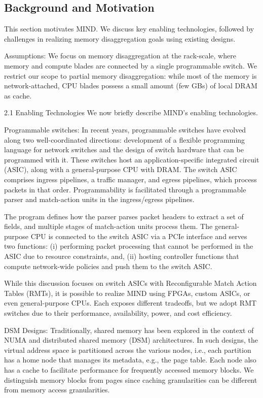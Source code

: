 \subsection{Background and Motivation}
This section motivates MIND. We discuss key enabling technologies, followed by challenges in realizing memory disaggregation goals using existing designs.

Assumptions: We focus on memory disaggregation at the rack-scale, where memory and compute blades are connected by a single programmable switch. We restrict our scope to partial memory disaggregation: while most of the memory is network-attached, CPU blades possess a small amount (few GBs) of local DRAM as cache.

2.1 Enabling Technologies
We now briefly describe MIND’s enabling technologies.

Programmable switches: In recent years, programmable switches have evolved along two well-coordinated directions: development of a flexible programming language for network switches and the design of switch hardware that can be programmed with it. These switches host an application-specific integrated circuit (ASIC), along with a general-purpose CPU with DRAM. The switch ASIC comprises ingress pipelines, a traffic manager, and egress pipelines, which process packets in that order. Programmability is facilitated through a programmable parser and match-action units in the ingress/egress pipelines.

The program defines how the parser parses packet headers to extract a set of fields, and multiple stages of match-action units process them. The general-purpose CPU is connected to the switch ASIC via a PCIe interface and serves two functions: (i) performing packet processing that cannot be performed in the ASIC due to resource constraints, and, (ii) hosting controller functions that compute network-wide policies and push them to the switch ASIC.

While this discussion focuses on switch ASICs with Reconfigurable Match Action Tables (RMTs), it is possible to realize MIND using FPGAs, custom ASICs, or even general-purpose CPUs. Each exposes different tradeoffs, but we adopt RMT switches due to their performance, availability, power, and cost efficiency.

DSM Designs: Traditionally, shared memory has been explored in the context of NUMA and distributed shared memory (DSM) architectures. In such designs, the virtual address space is partitioned across the various nodes, i.e., each partition has a home node that manages its metadata, e.g., the page table. Each node also has a cache to facilitate performance for frequently accessed memory blocks. We distinguish memory blocks from pages since caching granularities can be different from memory access granularities.


